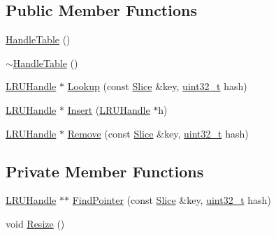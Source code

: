 \subsection*{Public Member Functions}
\begin{DoxyCompactItemize}
\item 
\hyperlink{classleveldb_1_1anonymous__namespace_02cache_8cc_03_1_1_handle_table_ae7c182c5e27c2167a948a0d4c1d079bc}{Handle\+Table} ()
\item 
\hyperlink{classleveldb_1_1anonymous__namespace_02cache_8cc_03_1_1_handle_table_a446683e919ed881c0dd79cfb39fe3351}{$\sim$\+Handle\+Table} ()
\item 
\hyperlink{structleveldb_1_1anonymous__namespace_02cache_8cc_03_1_1_l_r_u_handle}{L\+R\+U\+Handle} $\ast$ \hyperlink{classleveldb_1_1anonymous__namespace_02cache_8cc_03_1_1_handle_table_af372b21ccbd716a0ad91b50e7158284d}{Lookup} (const \hyperlink{classleveldb_1_1_slice}{Slice} \&key, \hyperlink{stdint_8h_a435d1572bf3f880d55459d9805097f62}{uint32\+\_\+t} hash)
\item 
\hyperlink{structleveldb_1_1anonymous__namespace_02cache_8cc_03_1_1_l_r_u_handle}{L\+R\+U\+Handle} $\ast$ \hyperlink{classleveldb_1_1anonymous__namespace_02cache_8cc_03_1_1_handle_table_ab156e299418fe3f56e3bf3689b852dd8}{Insert} (\hyperlink{structleveldb_1_1anonymous__namespace_02cache_8cc_03_1_1_l_r_u_handle}{L\+R\+U\+Handle} $\ast$h)
\item 
\hyperlink{structleveldb_1_1anonymous__namespace_02cache_8cc_03_1_1_l_r_u_handle}{L\+R\+U\+Handle} $\ast$ \hyperlink{classleveldb_1_1anonymous__namespace_02cache_8cc_03_1_1_handle_table_a98fe4a88a0b8063ae5cd0106bbc1a546}{Remove} (const \hyperlink{classleveldb_1_1_slice}{Slice} \&key, \hyperlink{stdint_8h_a435d1572bf3f880d55459d9805097f62}{uint32\+\_\+t} hash)
\end{DoxyCompactItemize}
\subsection*{Private Member Functions}
\begin{DoxyCompactItemize}
\item 
\hyperlink{structleveldb_1_1anonymous__namespace_02cache_8cc_03_1_1_l_r_u_handle}{L\+R\+U\+Handle} $\ast$$\ast$ \hyperlink{classleveldb_1_1anonymous__namespace_02cache_8cc_03_1_1_handle_table_a1e21b7164bb665d5b6dffa0250dd3917}{Find\+Pointer} (const \hyperlink{classleveldb_1_1_slice}{Slice} \&key, \hyperlink{stdint_8h_a435d1572bf3f880d55459d9805097f62}{uint32\+\_\+t} hash)
\item 
void \hyperlink{classleveldb_1_1anonymous__namespace_02cache_8cc_03_1_1_handle_table_a951ac12eb79ba848b384e5853a25a465}{Resize} ()
\end{DoxyCompactItemize}
